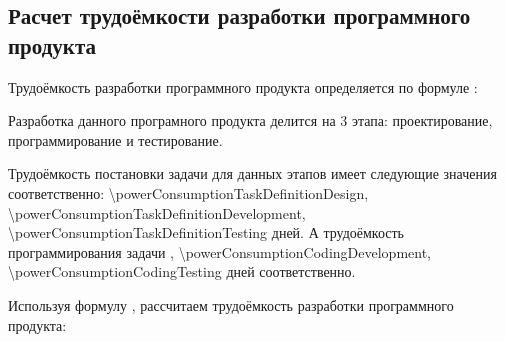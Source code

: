 \subsection{Расчет трудоёмкости разработки программного продукта}
\label{sec:economics:developmenteffort}

Трудоёмкость разработки программного продукта определяется по формуле :
\powerConsumptionDevelopmentEquation

Разработка данного програмного продукта делится на 3 этапа: проектирование, программирование и тестирование.

Трудоёмкость постановки задачи для данных этапов имеет следующие значения соответственно: \num{\powerConsumptionTaskDefinitionDesign}, \num{\powerConsumptionTaskDefinitionDevelopment}, \num{\powerConsumptionTaskDefinitionTesting} \! дней. А трудоёмкость программирования задачи \powerConsumptionCodingDesign, \num{\powerConsumptionCodingDevelopment}, \num{\powerConsumptionCodingTesting} \! дней соответственно.

Используя формулу , рассчитаем трудоёмкость разработки программного продукта:
\powerConsumptionDevelopmentFormulaApplied